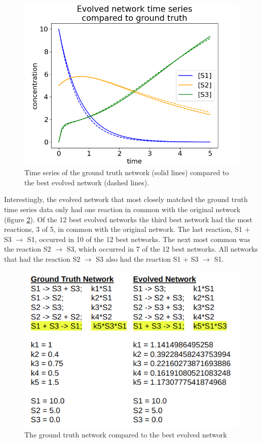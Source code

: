 \documentclass[12pt]{report}
\begin{document}
\begin{figure}
\centering
    \includegraphics[width=15cm]{images/ground_truth_vs_evolved.png}
    \caption[Time series of the ground truth network compared to the best evolved network]{Time series of the ground truth network (solid lines) compared to the best evolved network (dashed lines).}
    \label{fig:truth_vs_evolved}
\end{figure}

Interestingly, the evolved network that most closely matched the ground truth time series data only had one reaction in common with the original network (figure \ref{fig:evolved_network_structure}). Of the 12 best evolved networks the third best network had the most reactions, 3 of 5, in common with the original network. The last reaction, S1 + S3 $\to$ S1, occurred in 10 of the 12 best networks. The next most common was the reaction S2 $\to$ S3, which occurred in 7 of the 12 best networks. All networks that had the reaction S2 $\to$ S3 also had the reaction S1 + S3 $\to$ S1.

\begin{figure}
\centering
    \includegraphics[width=15cm]{images/antimony_truth_evolved.png}
    \caption[The ground truth network compared to the best evolved network]{The ground truth network compared to the best evolved network}
    \label{fig:evolved_network_structure}
\end{figure}
\end{document}
